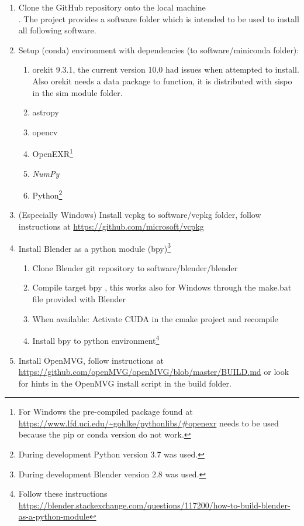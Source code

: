 \begin{enumerate}
    \item Clone the GitHub repository onto the local machine \\ . The project provides a software folder which is intended to be used to install all following software.
    \item Setup (conda) environment with dependencies (to software/miniconda folder):
    \begin{enumerate}
        \item orekit 9.3.1, the current version 10.0 had issues when attempted to install. Also orekit needs a data package to function, it is distributed with \gls{sispo} in the sim module folder.
        \item astropy
        \item opencv
        \item OpenEXR\footnote{For Windows the pre-compiled package found at \url{https://www.lfd.uci.edu/~gohlke/pythonlibs/\#openexr} needs to be used because the pip or conda version do not work.}
        \item \textit{NumPy}
        \item Python\footnote{During development Python version 3.7 was used.}
    \end{enumerate}{}
    \item (Especially Windows) Install vcpkg to software/vcpkg folder, follow instructions at \url{https://github.com/microsoft/vcpkg}
    \item Install Blender as a python module (bpy)\footnote{During development Blender version 2.8 was used.}
    \begin{enumerate}
        \item Clone Blender git repository to software/blender/blender \\ 
        \item Compile target bpy , this works also for Windows through the make.bat file provided with Blender
        \item When available: Activate CUDA in the cmake project and recompile
        \item Install bpy to python environment\footnote{Follow these instructions \url{https://blender.stackexchange.com/questions/117200/how-to-build-blender-as-a-python-module}}
    \end{enumerate}{}
    \item Install OpenMVG, follow instructions at \\ \url{https://github.com/openMVG/openMVG/blob/master/BUILD.md} or look for hints in the OpenMVG install script in the build folder.

\end{enumerate}
